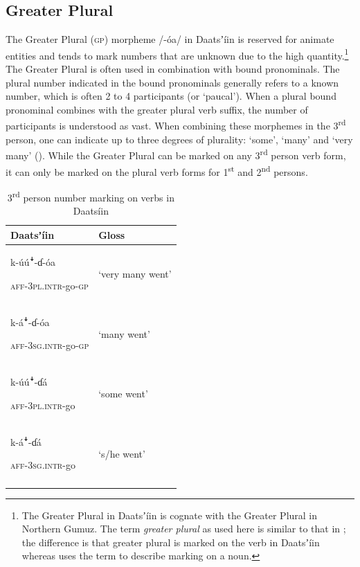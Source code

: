 \documentclass[output=paper]{langsci/langscibook}
\begin{document}
\subsection{Greater Plural}\label{sec:ahlandc:4.3}

The Greater Plural (\textsc{gp}) morpheme /-\'{o}a/ in Daatsʼíin is reserved for animate entities and tends to mark numbers that are unknown due to the high quantity.\footnote{The Greater Plural in Daatsʼíin is cognate with the Greater Plural in Northern Gumuz. The term \textit{greater plural} as used here is similar to that in \citet{Corbett2000}; the difference is that greater plural is marked on the verb in Daatsʼíin whereas \citet{Corbett2000} uses the term to describe marking on a noun.} The Greater Plural is often used in combination with bound pronominals. The plural number indicated in the bound pronominals generally refers to a known number, which is often 2 to 4 participants (or ‘paucal’).  When a plural bound pronominal combines with the greater plural verb suffix, the number of participants is understood as vast. When combining these morphemes in the 3\textsuperscript{rd} person, one can indicate up to three degrees of plurality: ‘some’, ‘many’ and ‘very many’ (). While the Greater Plural can be marked on any 3\textsuperscript{rd} person verb form, it can only be marked on the plural verb forms for 1\textsuperscript{st} and 2\textsuperscript{nd} persons.

\begin{table}

\begin{tabularx}{\textwidth}{XX}
\lsptoprule
Daatsʼíin & Gloss\\
\midrule
{k-\'{u}\'{u}\textsf{ꜜ}-ɗ{}-\'{o}a}

\textsc{aff-3pl.intr}{}-go-\textsc{gp} & ‘very many went’\\
{k-á\textsf{ꜜ}-ɗ{}-\'{o}a}

\textsc{aff-3sg.intr}{}-go-\textsc{gp} & ‘many went’\\
{k-\'{u}\'{u}\textsf{ꜜ}-ɗá}

\textsc{aff-3pl.intr}{}-go & ‘some went’\\
{k-á\textsf{ꜜ}-ɗá}

\textsc{aff-3sg.intr}{}-go & ‘s/he went’\\
\lspbottomrule
\end{tabularx}
\caption{3\textsuperscript{rd} person number marking on verbs in Daatsíin}
\label{tab:ahlandc:5}
\end{table}
\end{document}
